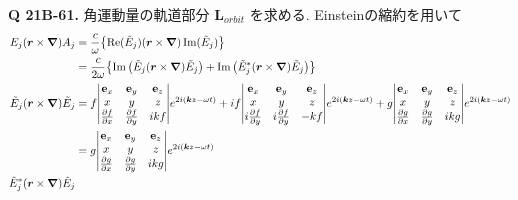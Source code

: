 \documentclass[uplatex,dvipdfmx,a4paper,11pt]{jlreq}
\newcommand{\rr}{\bm{r}}
\newcommand{\kk}{\bm{k}}
\newcommand{\Et}{\tilde{E}}
\newcommand{\LL}{\bm{L}}
\theoremstyle{definition}
\begin{document}
\textbf{Q 21B-61.}
角運動量の軌道部分 $\LL_{orbit}$ を求める. Einsteinの縮約を用いて
\begin{align}
  E_j(\rr\times\vnabla)A_j
                    & = \frac{c}{\omega}\qty{\Re(\Et_j)(\rr\times\vnabla)\Im(\Et_j)}                                                                                                                                                                                                                        \\
                    & = \frac{c}{2\omega}\qty{\Im\qty(\Et_j(\rr\times\vnabla)\Et_j) + \Im\qty(\Et_j^*(\rr\times\vnabla)\Et_j)}                                                                                                                                                                              \\
  \Et_j(\rr\times\vnabla)\Et_j
                    & = f\mqty|\vb{e}_x                                                                                                                                                                                                                                               & \vb{e}_y & \vb{e}_z \\ x & y & z \\ \pdv{f}{x} & \pdv{f}{y} & i kf | e^{2i(\kk z-\omega t)} + i f\mqty|\vb{e}_x                                                                                        & \vb{e}_y & \vb{e}_z \\ x & y & z \\ i\pdv{f}{y} & i\pdv{f}{y} & -kf | e^{2i(\kk z-\omega t)} + g\mqty|\vb{e}_x                                                                                        & \vb{e}_y & \vb{e}_z \\ x & y & z \\ \pdv{g}{x} & \pdv{g}{y} & i kg | e^{2i(\kk z-\omega t)} \\
                    & = g\mqty|\vb{e}_x                                                                                                                                                                                                                                               & \vb{e}_y & \vb{e}_z \\ x & y & z \\ \pdv{g}{x} & \pdv{g}{y} & i kg | e^{2i(\kk z-\omega t)} \\
  \Et_j^*(\rr\times\vnabla)\Et_j

\end{align}
\end{document}

